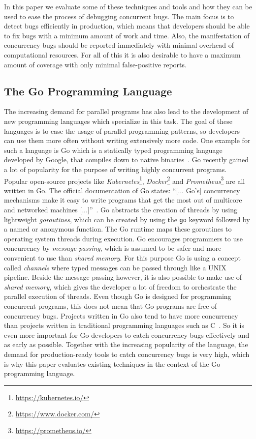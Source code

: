 \documentclass[english]{lni}
\begin{document}
In this paper we evaluate some of these techniques and tools and how they can be used to ease the process of debugging concurrent bugs.
The main focus is to detect bugs efficiently in production, which means that developers should be able to fix bugs with a minimum amount of work and time.
Also, the manifestation of concurrency bugs should be reported immediately with minimal overhead of computational resources.
For all of this it is also desirable to have a maximum amount of coverage with only minimal false-positive reports.

\subsection{The Go Programming Language}
The increasing demand for parallel programs has also lead to the development of new programming languages which specialize in this task.
The goal of these languages is to ease the usage of parallel programming patterns, so developers can use them more often without writing extensively more code.
One example for such a language is Go which is a statically typed programming language developed by Google, that compiles down to native binaries~\cite{goDocs}.
Go recently gained a lot of popularity for the purpose of writing highly concurrent programs.
Popular open-source projects like \emph{Kubernetes}\footnote{\url{https://kubernetes.io/}}, \emph{Docker}\footnote{\url{https://www.docker.com/}} and \emph{Prometheus}\footnote{\url{https://prometheus.io/}} are all written in Go.
The official documentation of Go states: ``[... Go's] concurrency mechanisms make it easy to write programs that get the most out of multicore and networked machines [...]''~\cite{goDocs}.
Go abstracts the creation of threads by using lightweight \emph{goroutines}, which can be created by using the \lstinline{go} keyword followed by a named or anonymous function.
The Go runtime maps these goroutines to operating system threads during execution.
Go encourages programmers to use concurrency by \emph{message passing}, which is assumed to be safer and more convenient to use than \emph{shared memory}.
For this purpose Go is using a concept called \emph{channels} where typed messages can be passed through like a UNIX pipeline.
Beside the message passing however, it is also possible to make use of \emph{shared memory}, which gives the developer a lot of freedom to orchestrate the parallel execution of threads.
Even though Go is designed for programming concurrent programs, this does not mean that Go programs are free of concurrency bugs.
Projects written in Go also tend to have more concurrency than projects written in traditional programming languages such as C~\cite{tu2019go}.
So it is even more important for Go developers to catch concurrency bugs effectively and as early as possible.
Together with the increasing popularity of the language, the demand for production-ready tools to catch concurrency bugs is very high, which is why this paper evaluates existing techniques in the context of the Go programming language.
\end{document}
